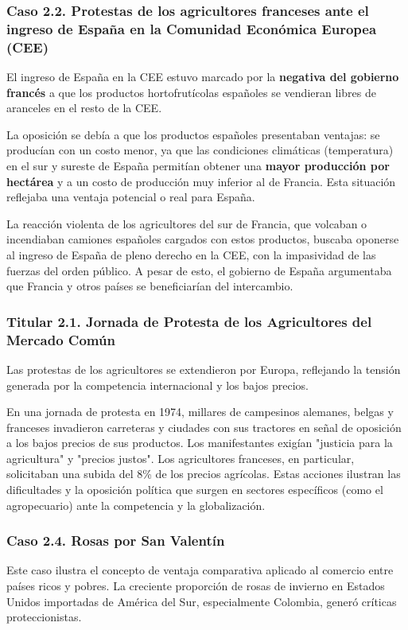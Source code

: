 \subsubsection{Caso 2.2. Protestas de los agricultores franceses ante el ingreso de España en la Comunidad Económica Europea (CEE)}
El ingreso de España en la CEE estuvo marcado por la \textbf{negativa del gobierno francés} a que los productos hortofrutícolas españoles se vendieran libres de aranceles en el resto de la CEE.

La oposición se debía a que los productos españoles presentaban ventajas: se producían con un costo menor, ya que las condiciones climáticas (temperatura) en el sur y sureste de España permitían obtener una \textbf{mayor producción por hectárea} y a un costo de producción muy inferior al de Francia. Esta situación reflejaba una ventaja potencial o real para España.

La reacción violenta de los agricultores del sur de Francia, que volcaban o incendiaban camiones españoles cargados con estos productos, buscaba oponerse al ingreso de España de pleno derecho en la CEE, con la impasividad de las fuerzas del orden público. A pesar de esto, el gobierno de España argumentaba que Francia y otros países se beneficiarían del intercambio.

\subsubsection{Titular 2.1. Jornada de Protesta de los Agricultores del Mercado Común}
Las protestas de los agricultores se extendieron por Europa, reflejando la tensión generada por la competencia internacional y los bajos precios.

\begin{ejemplo}
En una jornada de protesta en 1974, millares de campesinos alemanes, belgas y franceses invadieron carreteras y ciudades con sus tractores en señal de oposición a los bajos precios de sus productos. Los manifestantes exigían "justicia para la agricultura" y "precios justos". Los agricultores franceses, en particular, solicitaban una subida del 8\% de los precios agrícolas. Estas acciones ilustran las dificultades y la oposición política que surgen en sectores específicos (como el agropecuario) ante la competencia y la globalización.
\end{ejemplo}

\subsubsection{Caso 2.4. Rosas por San Valentín}
Este caso ilustra el concepto de ventaja comparativa aplicado al comercio entre países ricos y pobres. La creciente proporción de rosas de invierno en Estados Unidos importadas de América del Sur, especialmente Colombia, generó críticas proteccionistas.

